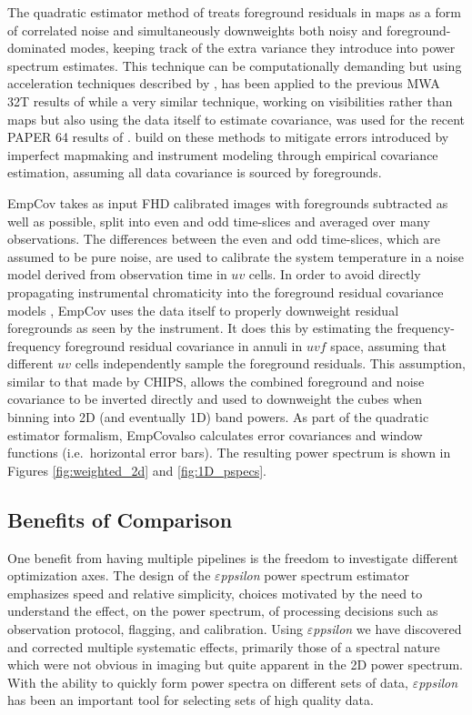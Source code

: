 \documentclass[twolcolumn,iop]{emulateapj}
\def\eppsilon{{\it $\varepsilon$ppsilon}}
\def\empirical{EmpCov}
\def\dilloncite{\cite{PhysRevD.91.123011} }
\begin{document}
The quadratic estimator method of \cite{Liu:2011p8763} treats foreground residuals in maps as a form of correlated noise and simultaneously downweights both noisy and foreground-dominated modes, keeping track of the extra variance they introduce into power spectrum estimates. This technique can be computationally demanding but using acceleration techniques described by \cite{Dillon:2013p10497}, has been applied to the previous MWA 32T results of \cite{Dillon:2014p9788} while a very similar technique, working on visibilities rather than maps but also using the data itself to estimate covariance, was used for the recent PAPER 64 results of \cite{2015ApJ...809...61A}.  \dilloncite{} build on these methods to mitigate errors introduced by imperfect mapmaking and instrument modeling through empirical covariance estimation, assuming all data covariance is sourced by foregrounds.

\empirical{} takes as input FHD calibrated images with foregrounds subtracted as well as possible, split into even and odd time-slices and averaged over many observations. The differences between the even and odd time-slices, which are assumed to be pure noise, are used to calibrate the system temperature in a noise model derived from observation time in $uv$ cells. In order to avoid directly propagating instrumental chromaticity into the foreground residual covariance models \citep{2015PhRvD..91b3002D}, \empirical{} uses the data itself to properly downweight residual foregrounds as seen by the instrument. It does this by estimating the frequency-frequency foreground residual covariance in annuli in $uvf$ space, assuming that different $uv$ cells independently sample the foreground residuals. This assumption, similar to that made by CHIPS, allows the combined foreground and noise covariance to be inverted directly and used to downweight the cubes when binning into 2D (and eventually 1D) band powers. As part of the quadratic estimator formalism, \empirical also calculates error covariances and window functions (i.e.\ horizontal error bars). The resulting power spectrum is shown in Figures \ref{fig:weighted_2d} and \ref{fig:1D_pspecs}.  



\subsection{Benefits of Comparison}
\label{sec:benefits_of_comparison}


One benefit from having multiple pipelines is the freedom to investigate  different optimization axes.  The design of the \eppsilon{} power spectrum estimator emphasizes speed and relative simplicity, choices  motivated by the need to understand the effect, on the power spectrum, of processing decisions such as observation protocol, flagging, and calibration. Using \eppsilon{} we have discovered and corrected multiple systematic effects, primarily those of a spectral nature which were not obvious in imaging but quite apparent in the 2D power spectrum. With the ability to quickly form power spectra on different sets of data, \eppsilon{} has been an important tool for selecting sets of high quality data. 
\end{document}
